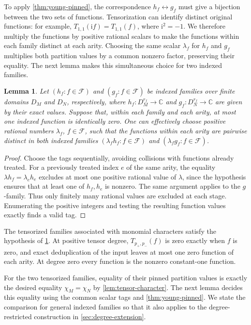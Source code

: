 \documentclass[11pt,letterpaper,onecolumn]{article}
\theoremstyle{plain}
\newtheorem{lemma}[lemma]{Lemma}
\theoremstyle{definition}
\theoremstyle{remark}
\newcommand{\AlgNums}{\mathbb C}
\newcommand{\cF}{\mathcal F}
\begin{document}
To apply \cref{thm:young-pinned}, the correspondence $h_f\leftrightarrow g_f$
must give a bijection between the two sets of functions.
Tensorization can identify distinct original functions:
for example, $T_{1,1}(\mathrm{i}f)=T_{1,1}(f)$, where $\mathrm{i}^2=-1$.
We therefore multiply the functions by positive rational scalars to make
the functions within each family distinct at each arity.  Choosing the same scalar
$\lambda_f$ for $h_f$ and $g_f$ multiplies both partition values by a
common nonzero factor, preserving their equality.
The next lemma makes this simultaneous choice for two indexed families.

\begin{lemma}
\label{lem:scalar-tags}
Let $(h_f:f\in\cF)$ and $(g_f:f\in\cF)$ be indexed families over finite
domains $D_M$ and $D_N$, respectively, where
$h_f:D_M^{r_f}\to\AlgNums$ and $g_f:D_N^{r_f}\to\AlgNums$ are given by their
exact values.  Suppose that, within
each family and each arity, at most one indexed function is identically zero.
One can effectively choose positive rational numbers $\lambda_f$, $f\in\cF$,
such that the functions within each arity are pairwise distinct in both
indexed families $(\lambda_f h_f:f\in\cF)$ and
$(\lambda_f g_f:f\in\cF)$.
\end{lemma}

\begin{proof}
Choose the tags sequentially, avoiding collisions with functions already
treated.  For a previously treated index $e$ of the
same arity, the equality
$\lambda h_f=\lambda_e h_e$ excludes at most one positive rational value of
$\lambda$, since the hypothesis ensures that at least one of $h_f,h_e$
is nonzero.  The same argument applies to the $g$-family.  Thus only
finitely many rational values are excluded at each stage.  Enumerating
the positive integers and testing the resulting function values exactly
finds a valid tag.
\end{proof}

The tensorized families associated with monomial characters satisfy the
hypothesis of \cref{lem:scalar-tags}.  At positive tensor degree,
$T_{p_+,p_-}(f)$ is zero exactly when $f$ is zero, and exact deduplication of the
input leaves at most one zero function of each arity.  At degree zero every
function is the nonzero constant-one function.

For the two tensorized families, equality of their pinned partition
values is exactly the desired equality $\chi_M=\chi_N$ by
\cref{lem:tensor-character}.  The next lemma decides this equality using
the common scalar tags and \cref{thm:young-pinned}.
We state the comparison for general indexed families so that it also
applies to the degree-restricted construction in \cref{sec:degree-extension}.
\end{document}
